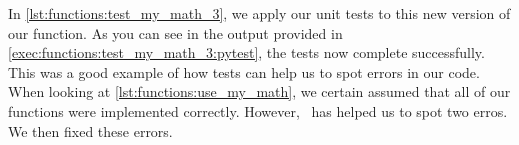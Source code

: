 %
In \cref{lst:functions:test_my_math_3}, we apply our unit tests to this new version of our  function.
As you can see in the output provided in \cref{exec:functions:test_my_math_3:pytest}, the tests now complete successfully.
This was a good example of how tests can help us to spot errors in our code.
When looking at \cref{lst:functions:use_my_math}, we certain assumed that all of our functions were implemented correctly.
However, \pytest\ has helped us to spot two erros.
We then fixed these errors.%
%
%
\endhsection%
%
\endhsection%
%
